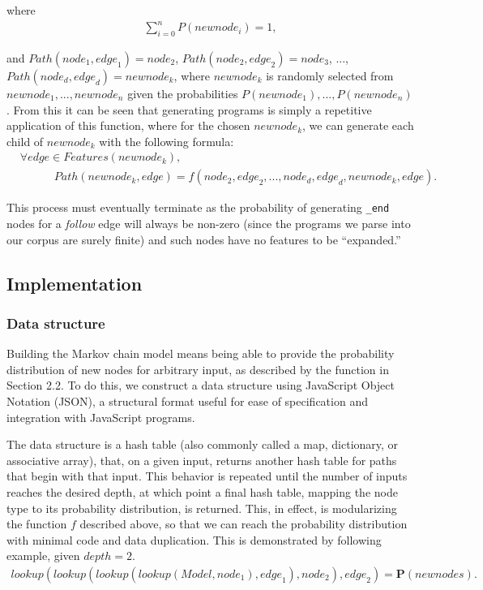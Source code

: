 \documentclass[titlepage]{article}
\begin{document}
where \begin{align*}
\sum\limits_{i = 0}^n P({newnode_i}) = 1,
\end{align*}

\noindent and ${Path}({node}_1, {edge}_1) = {node}_2$, ${Path}({node}_2, {edge}_2) = {node}_3$, ..., ${Path}({node}_d, {edge}_d) = {newnode}_k$, where ${newnode}_k$ is randomly selected from ${newnode}_1, ..., {newnode}_n$ given the probabilities $P({newnode_1}), ..., P({newnode_n})$. From this it can be seen that generating programs is simply a repetitive application of this function, where for the chosen ${newnode}_k$, we can generate each child of ${newnode}_k$ with the following formula: \begin{align*} &\forall {edge} \in {Features}({newnode}_k), \\
& \hspace{3em} {Path}({newnode}_k, {edge}) = f({node}_2, {edge}_2, ..., {node}_{d}, {edge}_{d}, {newnode}_k, {edge}).
\end{align*}

This process must eventually terminate as the probability of generating {\tt \_end} nodes for a \emph{follow} edge will always be non-zero (since the programs we parse into our corpus are surely finite) and such nodes have no features to be ``expanded.''

\subsection{Implementation}

\subsubsection{Data structure}

Building the Markov chain model means being able to provide the probability distribution of new nodes for arbitrary input,
as described by the function in Section 2.2. To do this, we construct a data structure using JavaScript Object Notation (JSON),
a structural format useful for ease of specification and integration with JavaScript programs.

The data structure is a hash table (also commonly called a map, dictionary, or associative array), that, on a given input, returns another hash table for paths that begin with that input. This behavior is repeated until the number of inputs reaches the desired depth, at which point a final hash table, mapping the node type to its probability distribution, is returned. This, in effect, is modularizing the function $f$ described above, so that we can reach the probability distribution with minimal code and data duplication. This is demonstrated by following example, given  ${depth} = 2$. \begin{align*}
lookup(lookup(lookup(lookup({Model}, {node}_1), {edge}_1), {node}_2), {edge}_2) = \textbf{P}({newnodes}).
\end{align*}
\end{document}
